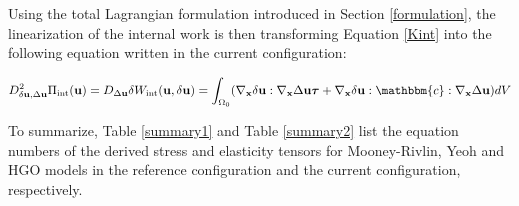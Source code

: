\begin{appendices}
Using the total Lagrangian formulation introduced in Section \ref{formulation}, the linearization of the internal work is then transforming Equation \ref{Kint} into the following equation written in the current configuration:

\begin{equation}
D^2_{\delta\bold{u}, \Delta\bold{u}}\Pi_\mathrm{int}(\bold{u}) = D_{\Delta{\bold{u}}}\delta{W_\mathrm{int}}(\bold{u}, \delta{\bold{u}}) = \int_{\Omega_0}(\nabla_{\bold{x}}\delta\bold{u} : \nabla_{\bold{x}}\Delta\bold{u}\boldsymbol{\tau} + \nabla_{\bold{x}}\delta{\bold{u}} : \mathbbm{c} :  \nabla_{\bold{x}}\Delta\bold{u})dV
\end{equation}

To summarize, Table \ref{summary1} and Table \ref{summary2} list the equation numbers of the derived stress and elasticity tensors for Mooney-Rivlin, Yeoh and HGO models in the reference configuration and the current configuration, respectively.

\end{appendices}
